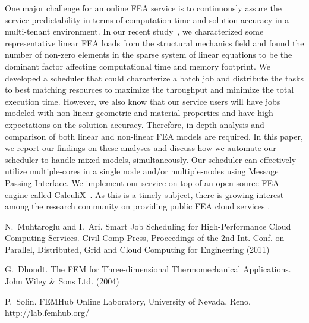 One major challenge for an online FEA service is to continuously assure the service predictability in terms of computation time and solution accuracy in a multi-tenant environment. In our recent study~\cite{Muhtaroglu:PARENG11}, we characterized some representative linear FEA loads from the structural mechanics field and found the number of non-zero elements in the sparse system of linear equations to be the dominant factor affecting computational time and memory footprint. We developed a scheduler that could characterize a batch job and distribute the tasks to best matching resources to maximize the throughput and minimize the total execution time. However, we also know that our service users will have jobs modeled with non-linear geometric and material properties and have high expectations on the solution accuracy. Therefore, in depth analysis and comparison of both linear and non-linear FEA models are required. In this paper, we report our findings on these analyses and discuss how we automate our scheduler to handle mixed models, simultaneously. Our scheduler can effectively utilize multiple-cores in a single node and/or multiple-nodes using Message Passing Interface. We implement our service on top of an open-source FEA engine called CalculiX~\cite{Dhondt04}. As this is a timely subject, there is growing interest among the research community on providing public FEA cloud services \cite{SolinFemHub}.


\begin{thebibliography}{10}

{\sc N.~Muhtaroglu and I.~Ari}. {Smart Job Scheduling for High-Performance Cloud Computing Services}. Civil-Comp Press, Proceedings of the 2nd Int. Conf. on
Parallel, Distributed, Grid and Cloud Computing for Engineering (2011)

{\sc G.~Dhondt}. {The FEM for Three-dimensional Thermomechanical Applications}. John Wiley \& Sons Ltd. (2004)

{\sc P.~Solin}. {FEMHub Online Laboratory, University of Nevada, Reno, http://lab.femhub.org/}
 
\end{thebibliography}